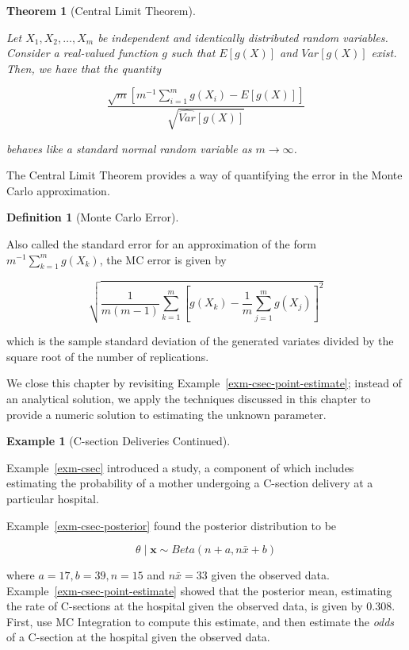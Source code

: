 \documentclass[
  letterpaper,
  DIV=11,
  numbers=noendperiod]{scrreprt}
\theoremstyle{definition}
\newtheorem{definition}{Definition}[chapter]
\theoremstyle{plain}
\newtheorem{theorem}{Theorem}[chapter]
\theoremstyle{definition}
\newtheorem{example}{Example}[chapter]
\theoremstyle{remark}
\begin{document}
\begin{theorem}[Central Limit
Theorem]\protect\hypertarget{thm-clt}{}\label{thm-clt}

Let \(X_1, X_2, \dotsc, X_m\) be independent and identically distributed
random variables. Consider a real-valued function \(g\) such that
\(E\left[g(X)\right]\) and \(Var\left[g(X)\right]\) exist. Then, we have
that the quantity

\[\frac{\sqrt{m} \left[m^{-1} \sum_{i=1}^{m} g\left(X_i\right) - E\left[g(X)\right]\right]}{\sqrt{\widehat{Var}\left[g(X)\right]}}\]

behaves like a standard normal random variable as
\(m \rightarrow \infty\).

\end{theorem}

The Central Limit Theorem provides a way of quantifying the error in the
Monte Carlo approximation.

\begin{definition}[Monte Carlo
Error]\protect\hypertarget{def-mc-error}{}\label{def-mc-error}

Also called the standard error for an approximation of the form
\(m^{-1} \sum\limits_{k=1}^{m} g\left(X_k\right)\), the MC error is
given by

\[\sqrt{\frac{1}{m(m-1)} \sum_{k=1}^{m} \left[g\left(X_k\right) - \frac{1}{m} \sum_{j=1}^{m} g\left(X_j\right)\right]^2}\]

which is the sample standard deviation of the generated variates divided
by the square root of the number of replications.

\end{definition}

We close this chapter by revisiting
Example~\ref{exm-csec-point-estimate}; instead of an analytical
solution, we apply the techniques discussed in this chapter to provide a
numeric solution to estimating the unknown parameter.

\begin{example}[C-section Deliveries
Continued]\protect\hypertarget{exm-csec-mc-integration}{}\label{exm-csec-mc-integration}

Example~\ref{exm-csec} introduced a study, a component of which includes
estimating the probability of a mother undergoing a C-section delivery
at a particular hospital.

Example~\ref{exm-csec-posterior} found the posterior distribution to be

\[\theta \mid \mathbf{x} \sim Beta\left(n + a, n\bar{x} + b\right)\]

where \(a = 17, b = 39, n = 15\) and \(n\bar{x} = 33\) given the
observed data.\\
Example~\ref{exm-csec-point-estimate} showed that the posterior mean,
estimating the rate of C-sections at the hospital given the observed
data, is given by 0.308. First, use MC Integration to compute this
estimate, and then estimate the \emph{odds} of a C-section at the
hospital given the observed data.

\end{example}
\end{document}
